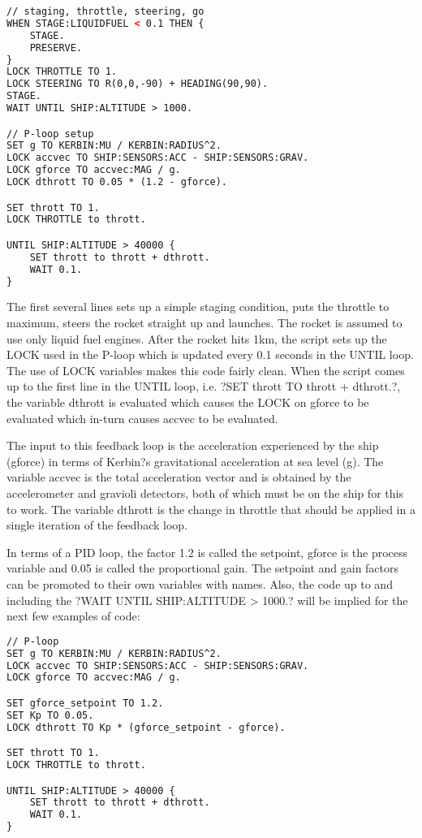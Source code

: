 \begin{lstlisting}[frame=single,language=XML]
// staging, throttle, steering, go
WHEN STAGE:LIQUIDFUEL < 0.1 THEN {
    STAGE.
    PRESERVE.
}
LOCK THROTTLE TO 1.
LOCK STEERING TO R(0,0,-90) + HEADING(90,90).
STAGE.
WAIT UNTIL SHIP:ALTITUDE > 1000.

// P-loop setup
SET g TO KERBIN:MU / KERBIN:RADIUS^2.
LOCK accvec TO SHIP:SENSORS:ACC - SHIP:SENSORS:GRAV.
LOCK gforce TO accvec:MAG / g.
LOCK dthrott TO 0.05 * (1.2 - gforce).

SET thrott TO 1.
LOCK THROTTLE to thrott.

UNTIL SHIP:ALTITUDE > 40000 {
    SET thrott to thrott + dthrott.
    WAIT 0.1.
}
\end{lstlisting} 

The first several lines sets up a simple staging condition, puts the throttle to maximum, steers the rocket straight up and launches. The rocket is assumed to use only liquid fuel engines. After the rocket hits 1km, the script sets up the LOCK used in the P-loop which is updated every 0.1 seconds in the UNTIL loop. The use of LOCK variables makes this code fairly clean. When the script comes up to the first line in the UNTIL loop, i.e. ?SET thrott TO thrott + dthrott.?, the variable dthrott is evaluated which causes the LOCK on gforce to be evaluated which in-turn causes accvec to be evaluated.

The input to this feedback loop is the acceleration experienced by the ship (gforce) in terms of Kerbin?s gravitational acceleration at sea level (g). The variable accvec is the total acceleration vector and is obtained by the accelerometer and gravioli detectors, both of which must be on the ship for this to work. The variable dthrott is the change in throttle that should be applied in a single iteration of the feedback loop.

In terms of a PID loop, the factor 1.2 is called the setpoint, gforce is the process variable and 0.05 is called the proportional gain. The setpoint and gain factors can be promoted to their own variables with names. Also, the code up to and including the ?WAIT UNTIL SHIP:ALTITUDE > 1000.? will be implied for the next few examples of code:

\begin{lstlisting}[frame=single,language=XML]
// P-loop
SET g TO KERBIN:MU / KERBIN:RADIUS^2.
LOCK accvec TO SHIP:SENSORS:ACC - SHIP:SENSORS:GRAV.
LOCK gforce TO accvec:MAG / g.

SET gforce_setpoint TO 1.2.
SET Kp TO 0.05.
LOCK dthrott TO Kp * (gforce_setpoint - gforce).

SET thrott TO 1.
LOCK THROTTLE to thrott.

UNTIL SHIP:ALTITUDE > 40000 {
    SET thrott to thrott + dthrott.
    WAIT 0.1.
}
\end{lstlisting} 

